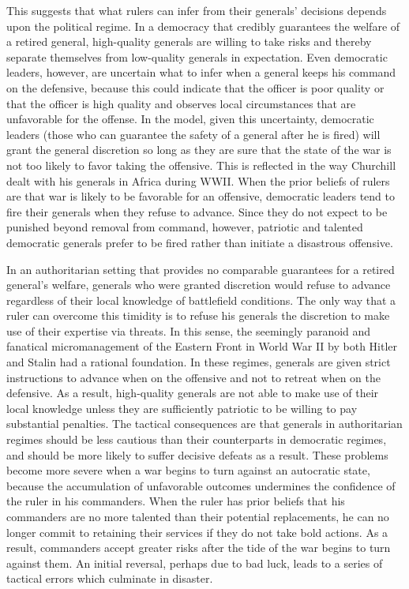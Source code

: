 \documentclass[11pt,]{article}
\begin{document}
This suggests that what rulers can infer from their generals' decisions depends upon the political regime.  In a democracy that credibly guarantees the welfare of a retired general, high-quality generals are willing to take risks and thereby separate themselves from low-quality generals in expectation.  Even democratic leaders, however, are uncertain what to infer when a general keeps his command on the defensive, because this could indicate that the officer is poor quality or that the officer is high quality and observes local circumstances that are unfavorable for the offense.  In the model, given this uncertainty, democratic leaders (those who can guarantee the safety of a general after he is fired) will grant the general discretion so long as they are sure that the state of the war is not too likely to favor taking the offensive.  This is reflected in the way Churchill dealt with his generals in Africa during WWII.  When the prior beliefs of rulers are that war is likely to be favorable for an offensive, democratic leaders tend to fire their generals when they refuse to advance.  Since they do not expect to be punished beyond removal from command, however, patriotic and talented democratic generals prefer to be fired rather than initiate a disastrous offensive.



In an authoritarian setting that provides no comparable guarantees for a retired general's welfare, generals who were granted discretion would refuse to advance regardless of their local knowledge of battlefield conditions.  The only way that a ruler can overcome this timidity is to refuse his generals the discretion to make use of their expertise via threats.  In this sense, the seemingly paranoid and fanatical micromanagement of the Eastern Front in World War II by both Hitler and Stalin had a rational foundation.  In these regimes, generals are given strict instructions to advance when on the offensive and not to retreat when on the defensive.  As a result, high-quality generals are not able to make use of their local knowledge unless they are sufficiently patriotic to be willing to pay substantial penalties.  The tactical consequences are that generals in authoritarian regimes should be less cautious than their counterparts in democratic regimes, and should be more likely to suffer decisive defeats as a result.  These problems become more severe when a war begins to turn against an autocratic state, because the accumulation of unfavorable outcomes undermines the confidence of the ruler in his commanders.  When the ruler has prior beliefs that his commanders are no more talented than their potential replacements, he can no longer commit to retaining their services if they do not take bold actions.  As a result, commanders accept greater risks after the tide of the war begins to turn against them.  An initial reversal, perhaps due to bad luck, leads to a series of tactical errors which culminate in disaster. 
\end{document}
